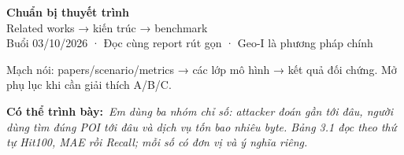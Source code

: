 \documentclass[10pt,a4paper]{article}
\newcommand{\key}[1]{\par\smallskip\noindent\colorbox{pale}{\parbox{\dimexpr\linewidth-2\fboxsep}{#1}}\par\smallskip}
\newcommand{\say}[1]{\par\textbf{Có thể trình bày:}\ \textit{#1}\par}
\begin{document}
\begin{center}
{\LARGE\bfseries\color{ink}Chuẩn bị thuyết trình}\\[5pt]
{\large Related works → kiến trúc → benchmark}\\[3pt]
{\small Buổi 03/10/2026 · Đọc cùng report rút gọn · Geo-I là phương pháp chính}
\end{center}
\key{Mạch nói: papers/scenario/metrics → các lớp mô hình → kết quả đối chứng. Mở phụ lục khi cần giải thích A/B/C.}


\clearpage

\say{Em dùng ba nhóm chỉ số: attacker đoán gần tới đâu, người dùng tìm đúng POI tới đâu và dịch vụ tốn bao nhiêu byte. Bảng 3.1 đọc theo thứ tự Hit100, MAE rồi Recall; mỗi số có đơn vị và ý nghĩa riêng.}

\clearpage


\clearpage


\clearpage

\end{document}
